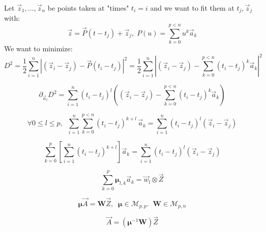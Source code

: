 \documentclass[aps,12pt]{revtex4}
\begin{document}
Let $\vec{z}_1,\ldots,\vec{z}_n$ be points taken at "times" $t_i=i$ and
we want to fit them at $t_j,\vec{z}_j$ with:
\begin{equation}
	\vec{z} = \vec{P}(t-t_j) + \vec{z}_j, \; P(u) = \sum_{k=0}^{p<n} u^k \vec{a}_k
\end{equation}
We want to minimize:
\begin{equation}
	D^2 = \dfrac{1}{2} \sum_{i=1}^n \left\vert
	\left(\vec{z}_i - \vec{z}_j\right) - \vec{P}(t_i-t_j)
	\right\vert^2 = \dfrac{1}{2} \sum_{i=1}^n \left\vert \left(\vec{z}_i - \vec{z}_j\right)  - \sum_{k=0}^{p<n} (t_i-t_j)^k \vec{a}_k
	\right\vert^2
\end{equation}

\begin{equation}
	\partial_{\vec{a}_l} D^2 = \sum_{i=1}^n (t_i-t_j)^l \left( \left(\vec{z}_i - \vec{z}_j\right)  
	- \sum_{k=0}^{p<n} (t_i-t_j)^k \vec{a}_k \right)
\end{equation}

\begin{equation}
\forall 0 \leq l \leq p, \;\; \sum_{i=1}^n  \sum_{k=0}^{p<n} (t_i-t_j)^{k+l} \, \vec{a}_k 
= \sum_{i=1}^n (t_i-t_j)^l \left(\vec{z}_i - \vec{z}_j\right) 
\end{equation}

\begin{equation}
	\sum_{k=0}^{p} \left[\sum_{i=1}^n (t_i-t_j)^{k+l} \right] \vec{a}_k = \sum_{i=1}^n (t_i-t_j)^l \left(\vec{z}_i - \vec{z}_j\right) 
\end{equation}

\begin{equation}
	\sum_{k=0}^{p} \bm{\mu}_{l,k} \vec{a}_k = \vec{w}_l \otimes \vec{Z}
\end{equation}
	

\begin{equation}
	\bm{\mu} \vec{A} = \bm{W} \vec{Z},\;\;\bm{\mu} \in \mathcal{M}_{p,p}.\;\;\bm{W} \in \mathcal{M}_{p,n}
\end{equation}

\begin{equation}
	\vec{A} = \left(\bm{\mu}^{-1}\bm{W}\right) \vec{Z}
\end{equation}
\end{document}
